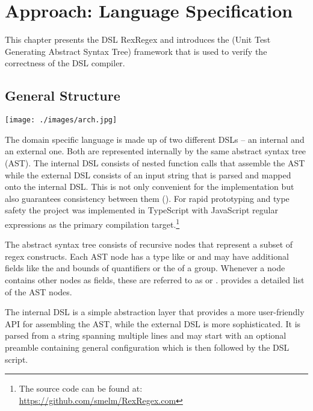 \chapter{Approach: Language Specification}

This chapter presents the DSL RexRegex and introduces the \utgast{} (Unit Test Generating Abstract Syntax Tree) framework that is used to verify the correctness of the DSL compiler.

\section{General Structure}

\begin{boxFigure}[title={Stages of compilation},label=fig:stagesOfCompilation]
\texttt{[image: ./images/arch.jpg]}
\end{boxFigure}

The domain specific language is made up of two different DSLs -- an internal and an external one. Both are represented internally by the same abstract syntax tree (AST). The internal DSL consists of nested function calls that assemble the AST while the external DSL consists of an input string that is parsed and mapped onto the internal DSL. This is not only convenient for the implementation but also guarantees consistency between them (). For rapid prototyping and type safety the project was implemented in TypeScript with JavaScript regular expressions as the primary compilation target.\footnote{The source code can be found at: \url{https://github.com/smelm/RexRegex.com}} 

The abstract syntax tree consists of recursive nodes that represent a subset of regex constructs. Each AST node has a type like  or  and may have additional fields like the  and  bounds of quantifiers or the  of a group. Whenever a node contains other nodes as fields, these are referred to as  or .  provides a detailed list of the AST nodes.

The internal DSL is a simple abstraction layer that provides a more user-friendly API for assembling the AST, while the external DSL is more sophisticated. It is parsed from a string spanning multiple lines and may start with an optional preamble containing general configuration which is then followed by the DSL script.


